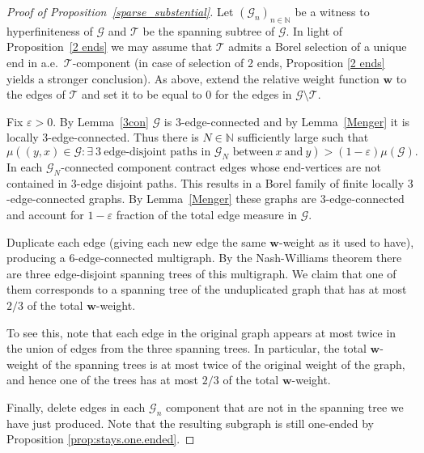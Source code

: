 \documentclass[letterpaper,11pt,reqno]{amsart}
\theoremstyle{bfnote}
\theoremstyle{definition}
\newcommand{\0}{\varnothing}
\renewcommand{\epsilon}{\varepsilon}
\newcommand{\eps}{\epsilon}
\newcommand{\w}{\mathbf{w}}
\numberwithin{equation}{section}
\begin{document}
\begin{proof}[Proof of Proposition~\ref{sparse_substential}]
    Let $(\mathcal{G}_n)_{n\in \mathbb N}$ be a witness to hyperfiniteness of $\mathcal{G}$ and $\mathcal{T}$ be the spanning subtree of $\mathcal{G}$. In light of Proposition~\ref{2 ends} we may assume that $\mathcal{T}$ admits a Borel selection of a unique end in a.e.~$\mathcal{T}$-component (in case of selection of 2 ends, Proposition \ref{2 ends} yields a stronger conclusion). As above, extend the relative weight function $\w$ to the edges of $\mathcal{T}$ and set it to be equal to $0$ for the edges in $\mathcal{G}\setminus\mathcal{T}$.
    
    Fix $\eps>0$. By Lemma~\ref{3con} $\mathcal{G}$ is $3$-edge-connected and by Lemma~\ref{Menger} it is locally $3$-edge-connected. Thus there is $N\in \mathbb N$ sufficiently large such that
    $$
        \mu\left((y,x) \in \mathcal{G} : \exists\ 3\ \text{edge-disjoint paths in $\mathcal{G}_N$ between}\ x\ \text{and}\ y\right) > (1 - \varepsilon) \mu (\mathcal{G}).
    $$
    In each $\mathcal{G}_N$-connected component contract edges whose end-vertices are not contained in $3$-edge disjoint paths. This results in a Borel family of finite locally $3$-edge-connected graphs. By Lemma~\ref{Menger} these graphs are $3$-edge-connected and account for $1-\varepsilon$ fraction of the total edge measure in $\mathcal{G}.$ 
    
    Duplicate each edge (giving each new edge the same $\w$-weight as it used to have), producing a $6$-edge-connected multigraph.  By the Nash-Williams theorem \cite{nash1961edge} there are three edge-disjoint spanning trees of this multigraph.  We claim that one of them corresponds to a spanning tree of the unduplicated graph that has at most $2/3$ of the total $\w$-weight.

    To see this, note that each edge in the original graph appears at most twice in the union of edges from the three spanning trees.  In particular, the total $\w$-weight of the spanning trees is at most twice of the original weight of the graph, and hence one of the trees has at most $2/3$ of the total $\w$-weight.

    Finally, delete edges in each $\mathcal{G}_n$ component that are not in the spanning tree we have just produced.  Note that the resulting subgraph is still one-ended by Proposition \ref{prop:stays.one.ended}.
\end{proof}


\end{document}
